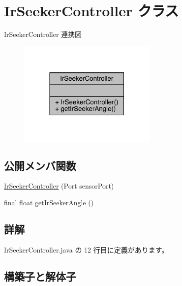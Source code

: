 \hypertarget{class_ir_seeker_controller}{}\section{Ir\+Seeker\+Controller クラス}
\label{class_ir_seeker_controller}


Ir\+Seeker\+Controller 連携図
\nopagebreak
\begin{figure}[H]
\begin{center}
\leavevmode
\includegraphics[width=192pt]{d0/d4d/class_ir_seeker_controller__coll__graph}
\end{center}
\end{figure}
\subsection*{公開メンバ関数}
\begin{DoxyCompactItemize}
\item 
\mbox{\hyperlink{class_ir_seeker_controller_a5013fb830f68f74855f46d6748af1a71}{Ir\+Seeker\+Controller}} (Port sensor\+Port)
\item 
final float \mbox{\hyperlink{class_ir_seeker_controller_a71fb9a9096eebd286ef0f02c6f603468}{get\+Ir\+Seeker\+Angle}} ()
\end{DoxyCompactItemize}


\subsection{詳解}


 Ir\+Seeker\+Controller.\+java の 12 行目に定義があります。



\subsection{構築子と解体子}
\mbox{\label{class_ir_seeker_controller_a5013fb830f68f74855f46d6748af1a71}} 
